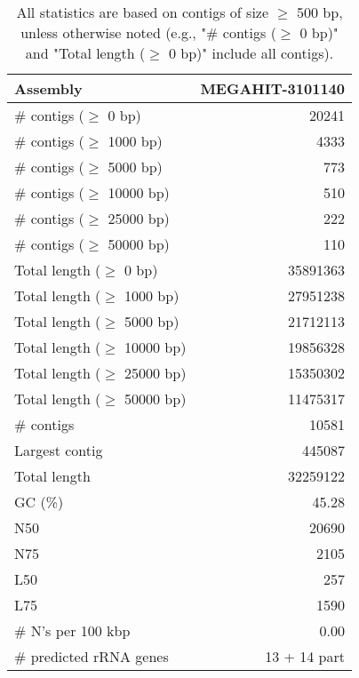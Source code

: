 \documentclass[12pt,a4paper]{article}
\begin{document}
\begin{table}[ht]
\begin{center}
\caption{All statistics are based on contigs of size $\geq$ 500 bp, unless otherwise noted (e.g., "\# contigs ($\geq$ 0 bp)" and "Total length ($\geq$ 0 bp)" include all contigs).}
\begin{tabular}{|l*{1}{|r}|}
\hline
Assembly & MEGAHIT-3101140 \\ \hline
\# contigs ($\geq$ 0 bp) & 20241 \\ \hline
\# contigs ($\geq$ 1000 bp) & 4333 \\ \hline
\# contigs ($\geq$ 5000 bp) & 773 \\ \hline
\# contigs ($\geq$ 10000 bp) & 510 \\ \hline
\# contigs ($\geq$ 25000 bp) & 222 \\ \hline
\# contigs ($\geq$ 50000 bp) & 110 \\ \hline
Total length ($\geq$ 0 bp) & 35891363 \\ \hline
Total length ($\geq$ 1000 bp) & 27951238 \\ \hline
Total length ($\geq$ 5000 bp) & 21712113 \\ \hline
Total length ($\geq$ 10000 bp) & 19856328 \\ \hline
Total length ($\geq$ 25000 bp) & 15350302 \\ \hline
Total length ($\geq$ 50000 bp) & 11475317 \\ \hline
\# contigs & 10581 \\ \hline
Largest contig & 445087 \\ \hline
Total length & 32259122 \\ \hline
GC (\%) & 45.28 \\ \hline
N50 & 20690 \\ \hline
N75 & 2105 \\ \hline
L50 & 257 \\ \hline
L75 & 1590 \\ \hline
\# N's per 100 kbp & 0.00 \\ \hline
\# predicted rRNA genes & 13 + 14 part \\ \hline
\end{tabular}
\end{center}
\end{table}
\end{document}
